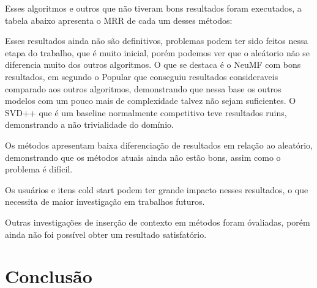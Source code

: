 \documentclass{article}
\begin{document}
Esses algoritmos e outros que não tiveram bons resultados foram executados, a tabela abaixo apresenta o MRR de cada um desses métodos:


\begin{table}[!hbt]
\noindent{}
   \caption{Resultados de MRR.}
   \label{tbl:mrr}
\end{table}

Esses resultados ainda não são definitivos, problemas podem ter sido feitos nessa etapa do trabalho, que é muito inicial, porém podemos ver que o aleátorio não se diferencia muito dos outros algoritmos. O que se destaca é o NeuMF com bons resultados, em segundo o Popular que conseguiu resultados consideraveis comparado aos outros algoritmos, demonstrando que nessa base os outros modelos com um pouco mais de complexidade talvez não sejam suficientes. O SVD++ que é um baseline normalmente competitivo teve resultados ruins, demonstrando a não trivialidade do domínio.

Os métodos apresentam baixa diferenciação de resultados em relação ao aleatório, demonstrando que os métodos atuais ainda não estão bons, assim como o problema é difícil.

Os usuários e itens cold start podem ter grande impacto nesses resultados, o que necessita de maior investigação em trabalhos futuros.

Outras investigações de inserção de contexto em métodos foram óvaliadas, porém ainda não foi possível obter um resultado satisfatório.

\section{Conclusão}
\end{document}
